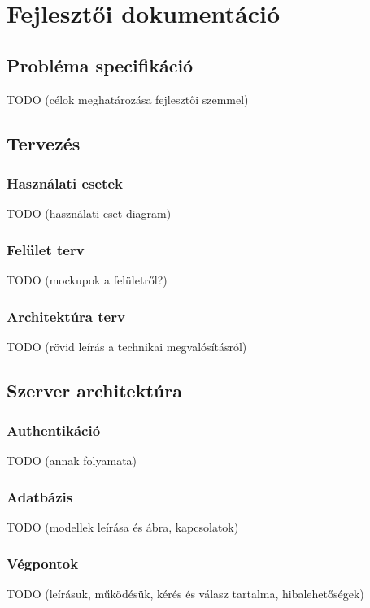 \documentclass{elteikthesis}
\begin{document}
	\chapter{Fejlesztői dokumentáció}

		\section{Probléma specifikáció}
		TODO (célok meghatározása fejlesztői szemmel)

		\section{Tervezés}

			\subsection{Használati esetek}
			TODO (használati eset diagram)
			
			\subsection{Felület terv}
			TODO (mockupok a felületről?)
			
			\subsection{Architektúra terv}
			TODO (rövid leírás a technikai megvalósításról)
		
		\section{Szerver architektúra}

			\subsection{Authentikáció}
			TODO (annak folyamata)
			
			\subsection{Adatbázis}
			TODO (modellek leírása és ábra, kapcsolatok)
			
			\subsection{Végpontok}
			TODO (leírásuk, működésük, kérés és válasz tartalma, hibalehetőségek)
			
\end{document}
